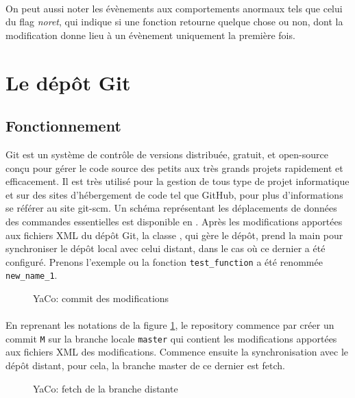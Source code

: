 \documentclass[11pt, book, english, french, standardlists]{upmethodology-document}
\begin{document}
				\paragraph*{}
					On peut aussi noter les évènements aux comportements anormaux tels que celui du flag \textit{noret}, qui indique si une fonction retourne quelque chose ou non, dont la modification donne lieu à un évènement uniquement la première fois.
		\section{Le dépôt Git}
			\subsection{Fonctionnement}
					Git est un système de contrôle de versions distribuée, gratuit, et open-source conçu pour gérer le code source des petits aux très grands projets rapidement et efficacement. Il est très utilisé pour la gestion de tous type de projet informatique et sur des sites d'hébergement de code tel que GitHub, pour plus d'informations se référer au site git-scm\cite{GitSCM}. Un schéma représentant les déplacements de données des commandes essentielles est disponible en .
					Après les modifications apportées aux fichiers \gls{XML} du dépôt Git, la classe , qui gère le dépôt, prend la main pour synchroniser le dépôt local avec celui distant, dans le cas où ce dernier a été configuré. Prenons l'exemple ou la fonction \texttt{test\_function} a été renommée \texttt{new\_name\_1}.
				\begin{figure}[H]
					\centering%
					\caption{YaCo: commit des modifications}%
					\label{fig:YaCo_repository1}%
				\end{figure}
				\paragraph*{}
					En reprenant les notations de la figure \ref{fig:YaCo_repository1}, le repository commence par créer un commit \texttt{M} sur la branche locale \texttt{master} qui contient les modifications apportées aux fichiers \gls{XML} des modifications. Commence ensuite la synchronisation avec le dépôt distant, pour cela, la branche master de ce dernier est fetch.
				\begin{figure}[H]
					\centering%
					\caption{YaCo: fetch de la branche distante}%
					\label{fig:YaCo_repository2}%
				\end{figure}
\end{document}
